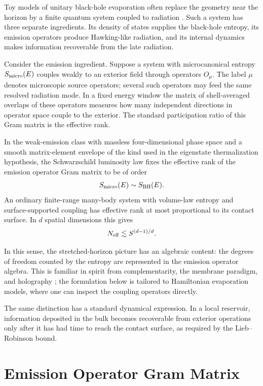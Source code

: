 \documentclass[12pt]{article}
\newcommand{\Neff}{N_{\rm eff}}
\newcommand{\Smicro}{S_{\rm micro}}
\begin{document}
Toy models of unitary black-hole evaporation often replace the geometry
near the horizon by a finite quantum system coupled to radiation
\cite{HaydenPreskill2007,LeutheusserVanRaamsdonk2017,SlobodovLong,
SlobodovNote}.  Such a system has three separate ingredients.  Its
density of states supplies the black-hole entropy, its
emission operators produce Hawking-like radiation, and its internal
dynamics makes information recoverable from the late radiation.

Consider the emission ingredient.  Suppose a system with
microcanonical entropy $\Smicro(E)$ couples weakly to an exterior field
through operators $O_\mu$.  The label $\mu$ denotes microscopic source
operators; several such operators may feed the same resolved radiation
mode.  In a fixed energy window the matrix of shell-averaged overlaps
of these operators measures how many independent directions in operator
space couple to the exterior.  The standard participation ratio of this
Gram matrix is the effective rank.

In the weak-emission class with massless four-dimensional phase space
and a smooth matrix-element envelope of the kind used in the eigenstate
thermalization hypothesis, the Schwarzschild luminosity law fixes the
effective rank of the emission operator Gram matrix to be of order
\[
  \Smicro(E) \sim S_{\rm BH}(E) .
\]
An ordinary finite-range many-body system with volume-law entropy and
surface-supported coupling has effective rank at most proportional to
its contact surface.  In $d$ spatial dimensions this gives
\[
  \Neff \lesssim S^{(d-1)/d}.
\]

In this sense, the stretched-horizon picture has an algebraic content:
the degrees of freedom counted by the entropy are represented in the
emission operator algebra.  This is familiar in spirit from
complementarity, the membrane paradigm, and holography
\cite{SusskindThorlaciusUglum1993,ThornePriceMacdonald1986,
tHooft1993,Susskind1995,Bousso2002}; the formulation below is tailored
to Hamiltonian evaporation models, where one can inspect the coupling
operators directly.

The same distinction has a standard dynamical expression.  In a local
reservoir, information deposited in the bulk becomes recoverable from
exterior operations only after it has had time to reach the contact
surface, as required by the Lieb--Robinson bound.

\section{Emission Operator Gram Matrix}
\end{document}
